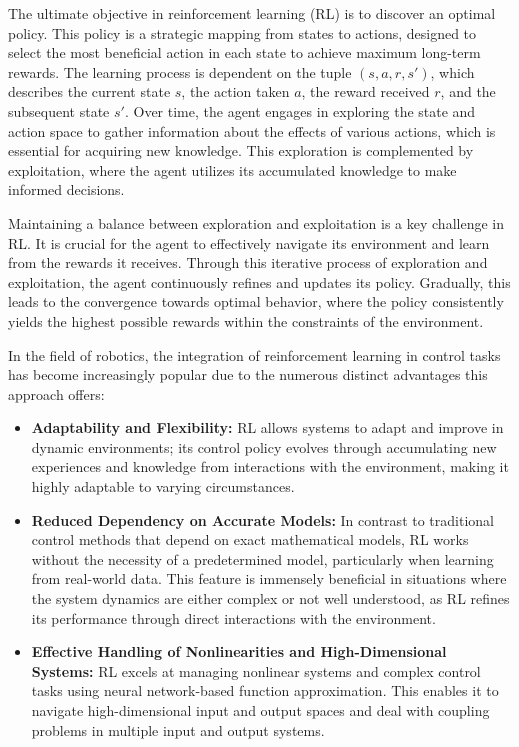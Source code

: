 The ultimate objective in reinforcement learning (RL) is to discover an optimal policy. This policy is a strategic mapping from states to actions, designed to select the most beneficial action in each state to achieve maximum long-term rewards. The learning process is dependent on the tuple \((s, a, r, s')\), which describes the current state \(s\), the action taken \(a\), the reward received \(r\), and the subsequent state \(s'\). Over time, the agent engages in exploring the state and action space to gather information about the effects of various actions, which is essential for acquiring new knowledge. This exploration is complemented by exploitation, where the agent utilizes its accumulated 
knowledge to make informed decisions.

Maintaining a balance between exploration and exploitation is a key challenge in RL. It is crucial for the agent to effectively navigate its environment and learn from the rewards it receives. Through this iterative process of exploration and exploitation, the agent continuously refines and updates its policy. Gradually, this leads to the convergence towards optimal behavior, where the policy consistently yields the highest possible rewards within the constraints of the environment.

In the field of robotics, the integration of reinforcement learning in control tasks\cite{kober2013reinforcement} has become increasingly popular due to the numerous distinct advantages this approach offers:

\begin{itemize}
    \item \textbf{Adaptability and Flexibility:}
    RL allows systems to adapt and improve in dynamic environments; its control policy evolves through accumulating new experiences and knowledge from interactions with the environment, making it highly adaptable to varying circumstances.

    \item \textbf{Reduced Dependency on Accurate Models:}
    In contrast to traditional control methods that depend on exact mathematical models, RL works without the necessity of a predetermined model, particularly when learning from real-world data. This feature is immensely beneficial in situations where the system dynamics are either complex or not well understood, as RL refines its performance through direct interactions with the environment.

    \item \textbf{Effective Handling of Nonlinearities and High-Dimensional Systems:}
    RL excels at managing nonlinear systems and complex control tasks using neural network-based function approximation. This enables it to navigate high-dimensional input and output spaces and deal with coupling problems in multiple input and output systems.
\end{itemize}

